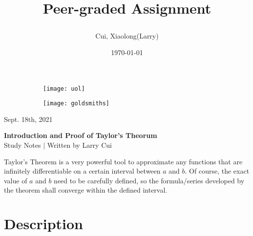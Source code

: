 \documentclass[11pt]{article}
\title{\vspace{-90pt} 



\textbf  {Peer-graded Assignment} }
\author{Cui, Xiaolong(Larry)}
\date{\today}
\begin{document}

\thispagestyle{plain}


\begin{figure}[H] %
  \begin{subfigure}{0.3\textwidth}
    \texttt{[image: uol]}
  \end{subfigure}
  \hfill
  \begin{subfigure}{0.3\textwidth}
    \texttt{[image: goldsmiths]}
  \end{subfigure}
\end{figure}


\begin{flushright}

\footnotesize {Sept. 18th,  2021}
\end{flushright}

\begin{center}
\textbf{Introduction and Proof of Taylor's Theorum} \\
\footnotesize {Study Notes $ | $ Written by Larry Cui}
\end{center}





\setcounter{figure}{0}

\vspace{10pt}


Taylor's Theorem is a very powerful tool to approximate any functions that are infinitely differentiable on a certain interval between $a$ and $b$.  Of course,  the exact value of $a$ and $b$ need to be carefully defined,  so the formula/series developed by the theorem shall converge within the defined interval.


\section {\large Description}
\end{document}
